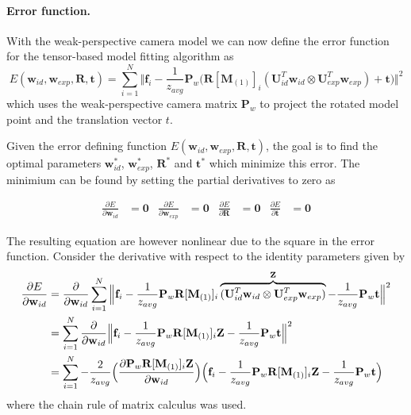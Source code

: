\documentclass[11pt,a4paper]{report}
\begin{document}
\paragraph{Error function.} With the weak-perspective camera model we can now define the error function for
the tensor-based model fitting algorithm as
\begin{equation}\label{eq:fit10}
E(\mathbf{w}_{id}, \mathbf{w}_{exp}, \mathbf{R}, \mathbf{t}) = \sum_{i=1}^N \Big\Vert\mathbf{f}_i - \frac{1}{z_{avg}}\mathbf{P}_w\Big(\mathbf{R}[\mathbf{M}_{(1)}]_{i}(\mathbf{U}_{id}^T\mathbf{w}_{id} \otimes
\mathbf{U}_{exp}^T\mathbf{w}_{exp}) + \mathbf{t}\Big)\Big\Vert^2
\end{equation}
which uses the weak-perspective camera matrix $\mathbf{P}_w$ to project the
rotated model point and the translation vector $t$. 

Given the error defining function $E(\mathbf{w}_{id}, \mathbf{w}_{exp}, \mathbf{R},
\mathbf{t})$, the goal is to find the optimal parameters $\mathbf{w}_{id}^*$,
$\mathbf{w}_{exp}^*$, $\mathbf{R}^*$ and
$\mathbf{t}^*$ which minimize this
error. The minimium can be found by setting the partial derivatives to zero as

\begin{align}\label{eq:fit11}
\frac{\partial E}{\partial \mathbf{w}_{id}} &= \mathbf{0} & \frac{\partial
  E}{\partial \mathbf{w}_{exp}} &= \mathbf{0} & \frac{\partial E}{\partial
  \mathbf{R}} &= \mathbf{0} & \frac{\partial E}{\partial \mathbf{t}} &= \mathbf{0}
\end{align}

The resulting equation are however nonlinear due to the square in the error
function. Consider the derivative with respect to the identity parameters given by 
\begin{align*}\label{eq:fit12}
\frac{\partial E}{\partial \mathbf{w}_{id}} &= \frac{\partial}{\partial \mathbf{w}_{id}}\sum_{i=1}^N \Big\Vert\mathbf{f}_i - \frac{1}{z_{avg}}\mathbf{P}_w\mathbf{R}[\mathbf{M}_{(1)}]_{i}\overbrace{(\mathbf{U}_{id}^T\mathbf{w}_{id} \otimes
\mathbf{U}_{exp}^T\mathbf{w}_{exp})}^{\mathbf{Z}} - \frac{1}{z_{avg}}\mathbf{P}_w\mathbf{t}\Big\Vert^2\\
&=\sum_{i=1}^N \frac{\partial}{\partial \mathbf{w}_{id}}\Big\Vert\mathbf{f}_i - \frac{1}{z_{avg}}\mathbf{P}_w\mathbf{R}[\mathbf{M}_{(1)}]_{i}\mathbf{Z} -
\frac{1}{z_{avg}}\mathbf{P}_w\mathbf{t}\Big\Vert^2\\
&=\sum_{i=1}^N -\frac{2}{z_{avg}}\Bigl(\frac{\partial \mathbf{P}_w\mathbf{R}[\mathbf{M}_{(1)}]_{i}\mathbf{Z}}{\partial
  \mathbf{w}_{id}}\Bigr)\Bigl(\mathbf{f}_i -
\frac{1}{z_{avg}}\mathbf{P}_w\mathbf{R}[\mathbf{M}_{(1)}]_{i}\mathbf{Z} -
\frac{1}{z_{avg}}\mathbf{P}_w\mathbf{t}\Bigr)
\end{align*}
where the chain rule of matrix calculus was used. 
\end{document}
